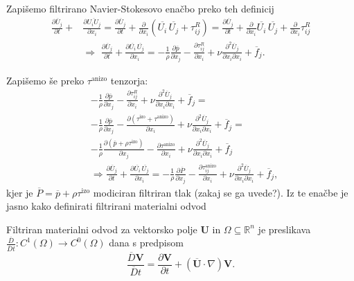 \documentclass[mat2, tisk]{fmfdelo}
\newcommand{\R}{\mathbb R}
\newcommand{\bd}{\textbf}
\begin{document}
Zapišemo filtrirano Navier-Stokesovo enačbo preko teh definicij
\begin{align*}
\frac{\partial \overline{U}_j}{\partial t} + &\frac{\partial \overline{U_i U_j}}{\partial x_i} = 
\frac{\partial \overline{U}_j}{\partial t} + \frac{\partial}{\partial x_i} (\overline{U_i}\, \overline{U_j} + \tau_{ij}^R) = 
\frac{\partial \overline{U}_j}{\partial t} + \frac{\partial}{\partial x_i} \overline{U_i}\, \overline{U_j} + \frac{\partial}{\partial x_i} \tau_{ij}^R\\[2mm]
&\Longrightarrow \,\,
\frac{\partial \overline{U}_j}{\partial t} + \frac{\partial \overline{U_i}\, \overline{U_j}}{\partial x_i} = -\frac{1}{\rho} \frac{\partial \overline{p}}{\partial x_j} 
- \frac{\partial \tau_{ij}^R}{\partial x_i}+ \nu \frac{\partial^2 \overline{U}_j}{\partial x_i \partial x_i} + \overline{f}_j.
\end{align*}

Zapišemo še preko $\tau^\text{anizo}$ tenzorja:
\begin{align*}
&-\frac{1}{\rho} \frac{\partial \overline{p}}{\partial x_j} - \frac{\partial \tau_{ij}^R}{\partial x_i}+ \nu \frac{\partial^2 \overline{U}_j}{\partial x_i \partial x_i} + \overline{f}_j = \\[1mm]
&-\frac{1}{\rho} \frac{\partial \overline{p}}{\partial x_j} - \frac{\partial (\tau^\text{izo} + \tau^\text{anizo}) }{\partial x_i}+ \nu \frac{\partial^2 \overline{U}_j}{\partial x_i \partial x_i} + \overline{f}_j = \\[1mm]
&-\frac{1}{\rho} \frac{\partial (\overline{p} + \rho\tau^\text{izo})}{\partial x_j} - \frac{\partial \tau^\text{anizo} }{\partial x_i}+ \nu \frac{\partial^2 \overline{U}_j}{\partial x_i \partial x_i} + \overline{f}_j \\[2mm]
&\Longrightarrow 
\frac{\partial \overline{U}_j}{\partial t} + \frac{\partial \overline{U_i}\, \overline{U_j}}{\partial x_i} = -\frac{1}{\rho} \frac{\partial \overline{P}}{\partial x_j} 
- \frac{\partial \tau_{ij}^\text{anizo}}{\partial x_i}+ \nu \frac{\partial^2 \overline{U}_j}{\partial x_i \partial x_i} + \overline{f}_j,
\end{align*}
kjer je $\overline{P} = \overline{p} + \rho\tau^\text{izo}$ modiciran filtriran tlak 
(zakaj se ga uvede?). Iz te enačbe je jasno kako definirati filtrirani materialni odvod 
\begin{definicija}
Filtriran materialni odvod za vektorsko polje $\bd{U}$ in $\Omega \subseteq \R^n$ je preslikava 
$\frac{\overline{D}}{\overline{D}t}: C^1(\Omega) \rightarrow C^0(\Omega)$ dana s predpisom
\begin{equation}
\frac{\overline{D} \bd{V}}{\overline{D}t} = \frac{\partial \bd{V}}{\partial t} + (\overline{\bd{U}}\cdot \nabla)\bd{V}.
\end{equation}
\end{definicija}
\end{document}

